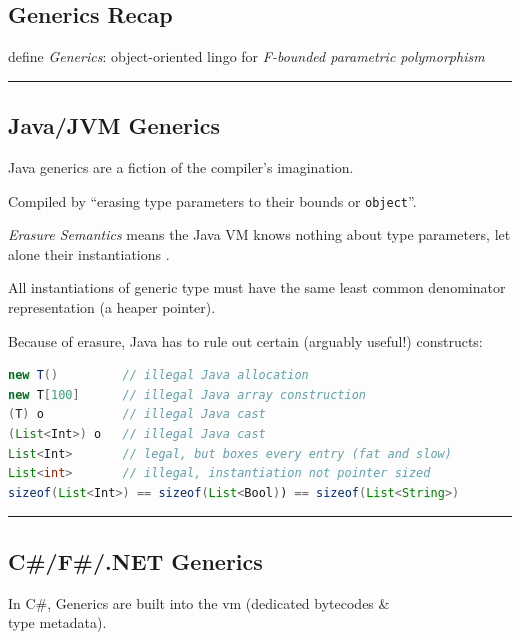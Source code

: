 \subsection{Generics Recap}\label{generics-recap}

define \emph{Generics}: object-oriented lingo for \emph{F-bounded
parametric polymorphism}

\begin{center}\rule{0.5\linewidth}{\linethickness}\end{center}

\subsection{Java/JVM Generics}\label{javajvm-generics}

Java generics are a fiction of the compiler's imagination.

Compiled by ``erasing type parameters to their bounds or
\lstinline!object!''.

\emph{Erasure Semantics} means the Java VM knows nothing about type
parameters, let alone their instantiations .

All instantiations of generic type must have the same least common
denominator representation (a heaper pointer).

Because of erasure, Java has to rule out certain (arguably useful!)
constructs:

\begin{lstlisting}[language=Java]
new T()         // illegal Java allocation
new T[100]      // illegal Java array construction
(T) o           // illegal Java cast 
(List<Int>) o   // illegal Java cast
List<Int>       // legal, but boxes every entry (fat and slow)
List<int>       // illegal, instantiation not pointer sized 
sizeof(List<Int>) == sizeof(List<Bool)) == sizeof(List<String>) 
\end{lstlisting}

\begin{center}\rule{0.5\linewidth}{\linethickness}\end{center}

\subsection{C\#/F\#/.NET Generics}\label{cf.net-generics}

In C\#, Generics are built into the vm (dedicated bytecodes \&\\
type metadata).

